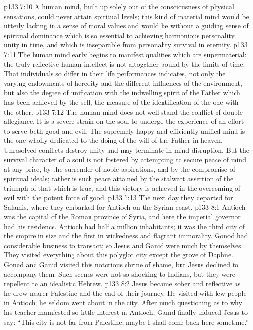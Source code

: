 \vs p133 7:10 \textcolor{ubdarkred}{A human mind, built up solely out of the consciousness of physical sensations, could never attain spiritual levels; this kind of material mind would be utterly lacking in a sense of moral values and would be without a guiding sense of spiritual dominance which is so essential to achieving harmonious personality unity in time, and which is inseparable from personality survival in eternity.}
\vs p133 7:11 \textcolor{ubdarkred}{The human mind early begins to manifest qualities which are supermaterial; the truly reflective human intellect is not altogether bound by the limits of time. That individuals so differ in their life performances indicates, not only the varying endowments of heredity and the different influences of the environment, but also the degree of unification with the indwelling spirit of the Father which has been achieved by the self, the measure of the identification of the one with the other.}
\vs p133 7:12 \textcolor{ubdarkred}{The human mind does not well stand the conflict of double allegiance. It is a severe strain on the soul to undergo the experience of an effort to serve both good and evil. The supremely happy and efficiently unified mind is the one wholly dedicated to the doing of the will of the Father in heaven. Unresolved conflicts destroy unity and may terminate in mind disruption. But the survival character of a soul is not fostered by attempting to secure peace of mind at any price, by the surrender of noble aspirations, and by the compromise of spiritual ideals; rather is such peace attained by the stalwart assertion of the triumph of that which is true, and this victory is achieved in the overcoming of evil with the potent force of good.}
\vs p133 7:13 \pc The next day they departed for Salamis, where they embarked for Antioch on the Syrian coast.
\vs p133 8:1 Antioch was the capital of the Roman province of Syria, and here the imperial governor had his residence. Antioch had half a million inhabitants; it was the third city of the empire in size and the first in wickedness and flagrant immorality. Gonod had considerable business to transact; so Jesus and Ganid were much by themselves. They visited everything about this polyglot city except the grove of Daphne. Gonod and Ganid visited this notorious shrine of shame, but Jesus declined to accompany them. Such scenes were not so shocking to Indians, but they were repellent to an idealistic Hebrew.
\vs p133 8:2 Jesus became sober and reflective as he drew nearer Palestine and the end of their journey. He visited with few people in Antioch; he seldom went about in the city. After much questioning as to why his teacher manifested so little interest in Antioch, Ganid finally induced Jesus to say: \textcolor{ubdarkred}{“This city is not far from Palestine; maybe I shall come back here sometime.”}
